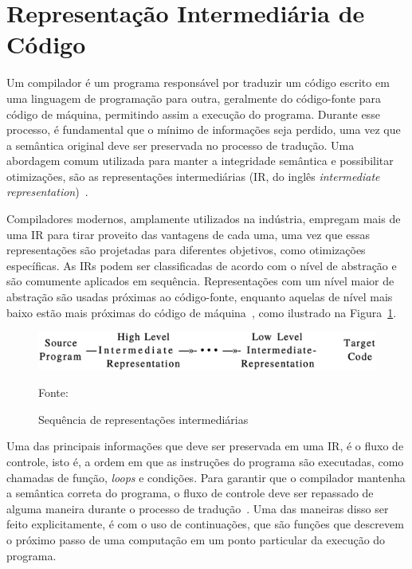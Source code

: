 \section{Representação Intermediária de Código}\label{sec:IR}

Um compilador é um programa responsável por traduzir um código escrito em uma linguagem de programação para outra, geralmente do código-fonte para código de máquina, permitindo assim a execução do programa.
Durante esse processo, é fundamental que o mínimo de informações seja perdido, uma vez que a semântica original deve ser preservada no processo de tradução.
Uma abordagem comum utilizada para manter a integridade semântica e possibilitar otimizações, são as representações intermediárias (IR, do inglês \textit{intermediate representation})~\cite{cooper2014construindo}.

Compiladores modernos, amplamente utilizados na indústria, empregam mais de uma IR para tirar proveito das vantagens de cada uma, uma vez que essas representações são projetadas para diferentes objetivos, como otimizações específicas.
As IRs podem ser classificadas de acordo com o nível de abstração e são comumente aplicados em sequência.
Representações com um nível maior de abstração são usadas próximas ao código-fonte, enquanto aquelas de nível mais baixo estão mais próximas do código de máquina~\cite{aho2008compilers}, como ilustrado na Figura~\ref{fig:abstraction-level-irs}.

\begin{figure}
  \centering
  \includegraphics[width=.7\textwidth]{Imagens/abstraction-level-irs.eps}
  \caption{Sequência de representações intermediárias}\label{fig:abstraction-level-irs}
  \small{Fonte:~\cite{aho2008compilers}}
\end{figure}

Uma das principais informações que deve ser preservada em uma IR, é o fluxo de controle, isto é, a ordem em que as instruções do programa são executadas, como chamadas de função, \textit{loops} e condições.
Para garantir que o compilador mantenha a semântica correta do programa, o fluxo de controle deve ser repassado de alguma maneira durante o processo de tradução~\cite{cooper2014construindo}.
Uma das maneiras disso ser feito explicitamente, é com o uso de continuações, que são funções que descrevem o próximo passo de uma computação em um ponto particular da execução do programa.

